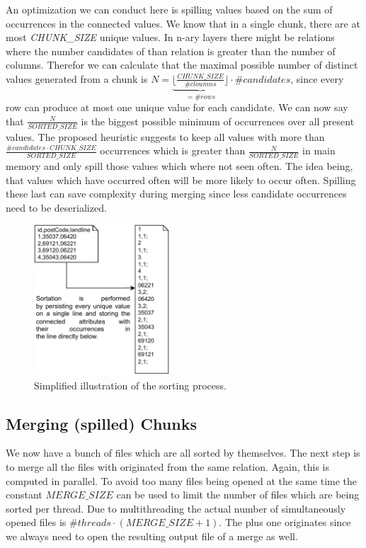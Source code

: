 An optimization we can conduct here is spilling values based on the sum of occurrences in the connected values. We know that in a single chunk, there are at most \textit{CHUNK\_SIZE} unique values. In n-ary layers there might be relations where the number candidates of than relation is greater than the number of columns. Therefor we can calculate that the maximal possible number of distinct values generated from a chunk is $N = \underbrace{\lfloor \frac{CHUNK\_SIZE}{\#cloumns} \rfloor}_{= \#rows} \cdot \#candidates$, since every row can produce at most one unique value for each candidate. We can now say that $\frac{N}{SORTED\_SIZE}$ is the biggest possible minimum of occurrences over all present values. The proposed heuristic suggests to keep all values with more than $\frac{\#candidates \cdot CHUNK\_SIZE}{SORTED\_SIZE}$ occurrences which is greater than $\frac{N}{SORTED\_SIZE}$ in main memory and only spill those values which where not seen often. The idea being, that values which have occurred often will be more likely to occur often. Spilling these last can save complexity during merging since less candidate occurrences need to be deserialized.

\begin{figure}[h]
    \centering
    \includegraphics[width=0.45\textwidth]{files/Sorting.pdf}
    \caption{Simplified illustration of the sorting process.}
    \label{fig:sorting}
\end{figure}

\subsection{Merging (spilled) Chunks}
We now have a bunch of files which are all sorted by themselves. The next step is to merge all the files with originated from the same relation. Again, this is computed in parallel. To avoid too many files being opened at the same time the constant $MERGE\_SIZE$ can be used to limit the number of files which are being sorted per thread. Due to multithreading the actual number of simultaneously opened files is $\#threads \cdot (MERGE\_SIZE + 1)$. The plus one originates since we always need to open the resulting output file of a merge as well.

